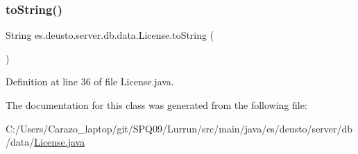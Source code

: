 \subsubsection{\texorpdfstring{to\+String()}{toString()}}
{\footnotesize\ttfamily String es.\+deusto.\+server.\+db.\+data.\+License.\+to\+String (\begin{DoxyParamCaption}{ }\end{DoxyParamCaption})}



Definition at line 36 of file License.\+java.



The documentation for this class was generated from the following file\+:\begin{DoxyCompactItemize}
\item 
C\+:/\+Users/\+Carazo\+\_\+laptop/git/\+S\+P\+Q09/\+Lurrun/src/main/java/es/deusto/server/db/data/\hyperlink{_license_8java}{License.\+java}\end{DoxyCompactItemize}
